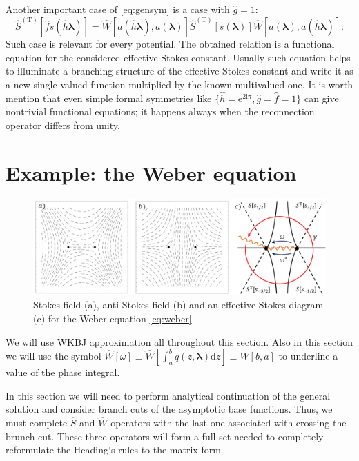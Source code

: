\documentclass[atmp]{ipart_v1}
\def\rmd{\mathrm{d}}
\def\rme{\mathrm{e}}
\def\rmi{\mathrm{i}}
\def\lmbd{\bm{\lambda}}
\def\f{\hat{f}}
\def\g{\hat{g}}
\def\h{\hat{h}}
\def\S{\widehat{S}}
\def\W{\widehat{W}}
\def\T{\mathrm{T}}
\def\unity{1}
\def\w{\omega}
\newcommand\eref[1]{\eqref{#1}}
\newcommand\phsintgrnd[1][z]{q(#1,\lmbd)}
\newcommand\phsintgrl[3][z]{\int_{#2}^{#3} \phsintgrnd[#1] \rmd #1}
\begin{document}
Another important case of \eref{eq:gensym} is a case with $\g=\unity$:
\begin{equation}
\S^{(\T)} \left[ \f s(\h\lmbd) \right] = 
\W \left[ a(\h\lmbd),a(\lmbd) \right]
\S^{(\T)} \left[ s(\lmbd) \right]
\W \left[ a(\lmbd),a(\h\lmbd) \right].
\label{eq:func}
\end{equation}
Such case is relevant for every potential. The obtained relation is a functional 
equation for the considered effective Stokes constant. Usually such equation helps to illuminate 
a branching structure of the effective Stokes constant and write it as a new single-valued function 
multiplied by the known multivalued one. 
It is worth mention that even simple formal 
symmetries like $\{\h=\rme^{2\rmi\pi},\g=\f=\unity\}$
can give nontrivial functional equations; it happens always when the reconnection operator
differs from unity.

\section{Example: the Weber equation \label{sec:weber}}

\begin{figure}
\centering
\noindent
\includegraphics[width=\textwidth]{wsd.png}
\caption{Stokes field (a), anti-Stokes field (b) and an effective Stokes diagram (c) 
for the Weber equation \eref{eq:weber}}
\label{fig:wsd}
\end{figure} 

We will use WKBJ approximation all throughout this section. Also in this section we will use the symbol 
$\W[\w] \equiv \W \left[\phsintgrl{a}{b} \right] \equiv \W[b,a]$ to underline a value of the phase integral.

In this section we will need to perform analytical continuation of the general solution and consider
branch cuts of the asymptotic base functions. Thus, we must complete $\S$ and $\W$ operators with
the last one associated with crossing the brunch cut. These three operators will form a full set
needed to completely reformulate the Heading`s rules to the matrix form.
\end{document}
